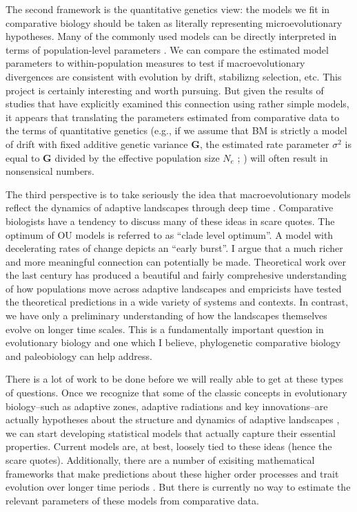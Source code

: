 The second framework is the quantitative genetics view: the models we fit in comparative biology should be taken as literally representing microevolutionary hypotheses. Many of the commonly used models can be directly interpreted in terms of population-level parameters \citep{HansenMartins1996, PennellHarmon}. We can compare the estimated model parameters to within-population measures to test if macroevolutionary divergences are consistent with evolution by drift, stabilizng selection, etc. This project is certainly interesting and worth pursuing. But given the results of studies that have explicitly examined this connection \citep{Lynch1990, EstesArnold2007, Hohenlohe2008, Harmon2010, Bolstad2014} using rather simple models, it appears that translating the parameters estimated from comparative data to the terms of quantitative genetics (e.g., if we assume that BM is strictly a model of drift with fixed additive genetic variance $\mathbf{G}$, the estimated rate parameter $\sigma^2$ is equal to $\mathbf{G}$ divided by the effective population size $N_e$ ; \citealt{Lande1976}) will often result in nonsensical numbers. 

The third perspective is to take seriously the idea that macroevolutionary models reflect the dynamics of adaptive landscapes through deep time \citep{Arnoldetal2001, Hansen2012book, PennellPE}. Comparative biologists have a tendency to discuss many of these ideas in scare quotes. The optimum of OU models is referred to as ``clade level optimum''. A model with decelerating rates of change depicts an ``early burst''. I argue that a much richer and more meaningful connection can potentially be made. Theoretical work over the last century has produced a beautiful and fairly comprehesive understanding of how populations move across adaptive landscapes and empricists have tested the theoretical predictions in a wide variety of systems and contexts. In contrast, we have only a preliminary understanding of how the landscapes themselves evolve on longer time scales. This is a fundamentally important question in evolutionary biology and one which I believe, phylogenetic comparative biology and paleobiology can help address. 

There is a lot of work to be done before we will really able to get at these types of questions. Once we recognize that some of the classic concepts in evolutionary biology--such as adaptive zones, adaptive radiations and key innovations--are actually hypotheses about the structure and dynamics of adaptive landscapes \citep{Hansen2012book}, we can start developing statistical models that actually capture their essential properties. Current models are, at best, loosely tied to these ideas (hence the scare quotes). Additionally, there are a number of exisiting mathematical frameworks that make predictions about these higher order processes and trait evolution over longer time periods \citep[see for example,][]{Holt2003, Gavrilets2004, Doebeli2011}. But there is currently no way to estimate the relevant parameters of these models from comparative data.  


